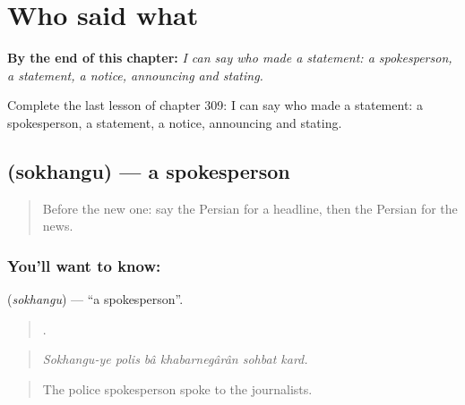 
\chapter{Who said what}
\label{ch:fa-who-said-what}

\begin{chapteropening}
\textbf{By the end of this chapter:} \emph{I can say who made a statement: a spokesperson, a statement, a notice, announcing and stating.}

Complete the last lesson of chapter 309: I can say who made a statement: a spokesperson, a statement, a notice, announcing and stating.
\end{chapteropening}

\section[\texorpdfstring{\fa{سخنگو} (sokhangu)}{سخنگو (sokhangu)}]{ (sokhangu) — a spokesperson}

\label{lesson:FA-C309-sokhangu}



\begin{quote}
Before the new one: say the Persian for a headline, then the Persian for the news.
\end{quote}

\subsection*{You'll want to know: }
\textbf{} (\emph{sokhangu}) — \textquotedblleft{}a spokesperson\textquotedblright{}.

\begin{quote}
     .
\end{quote}

\begin{quote}
\emph{Sokhangu-ye polis bâ khabarnegârân sohbat kard.}
\end{quote}

\begin{quote}
The police spokesperson spoke to the journalists.
\end{quote}


